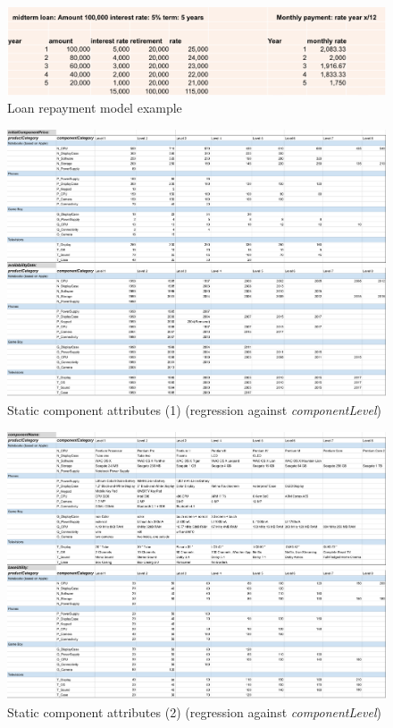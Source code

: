 \begin{figure}
    \centering
    \includegraphics[width=\textwidth]{images/loanRepayment.png}
    \caption{Loan repayment model example}
    \label{fig:loanRepayment}
\end{figure}

\begin{landscape}
\begin{figure}
    \centering
    \includegraphics[scale = 0.55]{images/staticComponentAttributes1a.pdf}
    \caption{Static component attributes (1) (regression against \textit{componentLevel})}
    \label{fig:staticComponentAttributes1}
\end{figure}
\end{landscape}

\begin{landscape}
\begin{figure}
    \centering
    \includegraphics[scale = 0.55]{images/staticComponentAttributes2a.pdf}
    \caption{Static component attributes (2) (regression against \textit{componentLevel})}
    \label{fig:staticComponentAttributes2}
\end{figure}
\end{landscape}